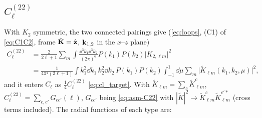 \subsection{\texorpdfstring{$C^{(22)}_\ell$}{C22}}
\label{sec:asm-cl22}
With $K_2$ symmetric, the two connected pairings give (\eqref{eq:loops}, (C1) of \eqref{eq:C1C2}, frame $\hat{\mathbf K}=\hat{\mathbf z}$,
$\mathbf k_{1,2}$ in the $x$--$z$ plane)
\begin{align}
C^{(22)}_\ell&=\frac{2}{2\ell+1}\sum_m\!\int\!\frac{\dd^3k_1\dd^3k_2}{(2\pi)^6}P(k_1)P(k_2)\big|K_{2,\ell m}\big|^2\nonumber\\
&=\frac1{4\pi^4(2\ell+1)}\int\!k_1^2\dd k_1\,k_2^2\dd k_2\,P(k_1)P(k_2)\int_{-1}^1\!\dd\mu\sum_m\big|\tilde K_{\ell m}(k_1,k_2,\mu)\big|^2 ,
\label{eq:asm-C22}
\end{align}
and it enters $C_\ell$ as $\tfrac14C^{(22)}_\ell$ \eqref{eq:cl_target}.  With $\tilde K_{\ell m}=\sum_c\tilde K^c_{\ell m}$,
$C^{(22)}_\ell=\sum_{c,c'}G_{cc'}(\ell)$, $G_{cc'}$ being \eqref{eq:asm-C22} with $|\tilde K|^2\to\tilde K^c_{\ell m}\tilde K^{c'*}_{\ell m}$ (cross
terms included).  The radial functions of each type are:
